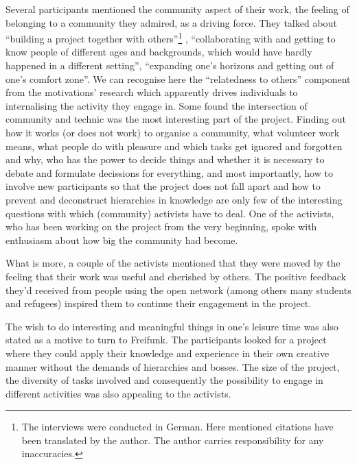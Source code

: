 Several participants mentioned the community aspect of their work, the feeling of belonging to a community they admired, as a driving force.
They talked about ``building a project together with others''\footnote{The interviews were conducted in German. Here mentioned citations have been translated by the author. The author carries responsibility for any inaccuracies.}
, ``collaborating with and getting to know people of different ages and backgrounds, which would have hardly happened in a different setting'', ``expanding one's horizons and getting out of one's comfort zone''.
We can recognise here the ``relatedness to others'' component from the motivations' research which apparently drives individuals to internalising the activity they engage in.
Some found the intersection of community and technic was the most interesting part of the project.
Finding out how it works (or does not work) to organise a community, what volunteer work means, what people do with pleasure and which tasks get ignored and forgotten and why, who has the power to decide things and whether it is necessary to debate and formulate decissions for everything, and most importantly, how to involve new participants so that the project does not fall apart and how to prevent and deconstruct hierarchies in knowledge are only few of the interesting questions with which (community) activists have to deal.
One of the activists, who has been working on the project from the very beginning, spoke with enthusiasm about how big the community had become.

What is more, a couple of the activists mentioned that they were moved by the feeling that their work was useful and cherished by others.
The positive feedback they'd received from people using the open network (among others many students and refugees) inspired them to continue their engagement in the project.

The wish to do interesting and meaningful things in one's leisure time was also stated as a motive to turn to Freifunk.
The participants looked for a project where they could apply their knowledge and experience in their own creative manner without the demands of hierarchies and bosses.
The size of the project, the diversity of tasks involved and consequently the possibility to engage in different activities was also appealing to the activists.

